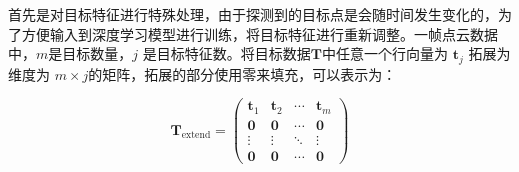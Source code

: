 首先是对目标特征进行特殊处理，由于探测到的目标点是会随时间发生变化的，为了方便输入到深度学习模型进行训练，将目标特征进行重新调整。一帧点云数据中，$m$是目标数量，$j$ 是目标特征数。将目标数据$\mathbf{T}$中任意一个行向量为 $\mathbf{t}_j$
拓展为维度为 $m \times j$的矩阵，拓展的部分使用零来填充，可以表示为：

\begin{equation}
    \mathbf{T}_{\text{extend}} = \begin{pmatrix}
        \mathbf{t}_1 & \mathbf{t}_2 & \cdots & \mathbf{t}_m \\
        \mathbf{0} & \mathbf{0} & \cdots & \mathbf{0} \\
        \vdots & \vdots & \ddots & \vdots \\
        \mathbf{0} & \mathbf{0} & \cdots & \mathbf{0}
    \end{pmatrix}
\end{equation}

